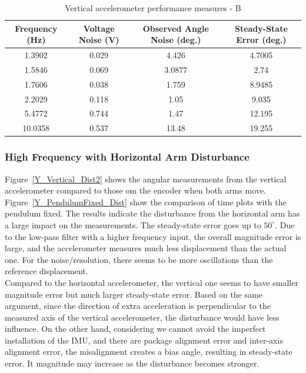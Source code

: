 \documentclass{article}
\theoremstyle{plain}
\theoremstyle{definition}
\theoremstyle{remark}
\begin{document}
\begin{table}
\begin{center}
    \begin{tabular}{|c|c|c|c|}
        \hline
        Frequency (Hz)  & Voltage Noise (V) & Observed Angle Noise (deg.) & Steady-State Error (deg.) \\ \hline
	1.3902  & 0.029  & 4.426 & 4.7005\\
       1.5846  & 0.069  & 3.0877 & 2.74 \\
	1.7606  & 0.038 & 1.759 & 8.9485  \\
	2.2029 & 0.118  & 1.05 & 9.035   \\
	5.4772 & 0.744  & 1.47 & 12.195  \\
	10.0358 & 0.537 & 13.48 & 19.255 \\
        \hline
    \end{tabular}
\caption{Vertical accelerometer performance measures - B}  
\label{vertical_tableB}
\end{center}
\end{table}


\subsubsection{High Frequency with Horizontal Arm Disturbance} 

Figure~\ref{Y_Vertical_Dist2} shows the angular measurements from the vertical accelerometer compared to those om the encoder when both arms move. Figure~\ref{Y_PendulumFixed_Dist} show the comparison of time plots with the pendulum fixed. The results indicate the disturbance from the horizontal arm has a large impact on the measurements. The steady-state error goes up to $50^\circ$. Due to the low-pass filter with a higher frequency input, the overall magnitude error is large, and the accelerometer measures much less displacement than the actual one. For the noise/resolution, there seems to be more oscillations than the reference displacement.\\ 

Compared to the horizontal accelerometer, the vertical one seems to have smaller magnitude error but much larger steady-state error. Based on the same argument, since the direction of extra acceleration is perpendicular to the measured axis of the vertical accelerometer, the disturbance would have less influence. On the other hand, considering we cannot avoid the imperfect installation of the IMU, and there are package alignment error and inter-axis alignment error, the misalignment creates a bias angle, resulting in steady-state error. It magnitude may increase as the disturbance becomes stronger.  \\
\end{document}
